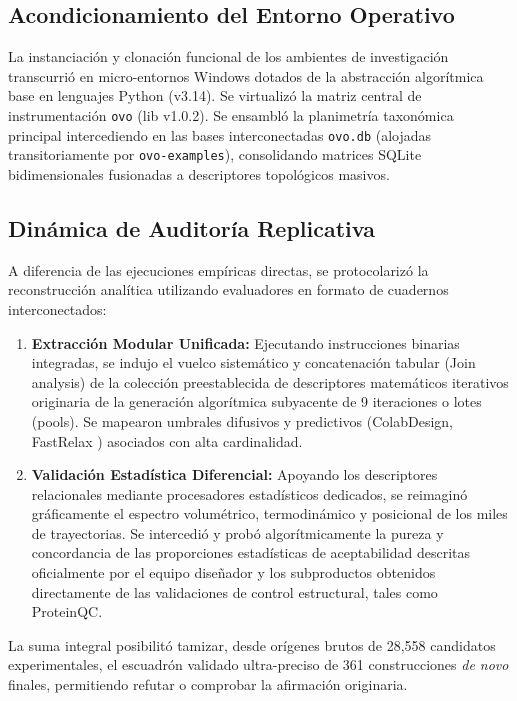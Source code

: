 \documentclass[10pt,a4paper,twocolumn]{article}
\begin{document}
\subsection{Acondicionamiento del Entorno Operativo}

La instanciación y clonación funcional de los ambientes de investigación transcurrió en micro-entornos Windows dotados de la abstracción algorítmica base en lenguajes Python (v3.14). Se virtualizó la matriz central de instrumentación \texttt{ovo} (lib v1.0.2). Se ensambló la planimetría taxonómica principal intercediendo en las bases interconectadas \texttt{ovo.db} (alojadas transitoriamente por \texttt{ovo-examples}), consolidando matrices SQLite bidimensionales fusionadas a descriptores topológicos masivos. 

\subsection{Dinámica de Auditoría Replicativa}

A diferencia de las ejecuciones empíricas directas, se protocolarizó la reconstrucción analítica utilizando evaluadores en formato de cuadernos interconectados:

\begin{enumerate}
    \item \textbf{Extracción Modular Unificada:} Ejecutando instrucciones binarias integradas, se indujo el vuelco sistemático y concatenación tabular (Join analysis) de la colección preestablecida de descriptores matemáticos iterativos originaria de la generación algorítmica subyacente de 9 iteraciones o lotes (pools). Se mapearon umbrales difusivos y predictivos (ColabDesign, FastRelax \cite{bennett2023}) asociados con alta cardinalidad.  
    \item \textbf{Validación Estadística Diferencial:} Apoyando los descriptores relacionales mediante procesadores estadísticos dedicados, se reimaginó gráficamente el espectro volumétrico, termodinámico y posicional de los miles de trayectorias. Se intercedió y probó algorítmicamente la pureza y concordancia de las proporciones estadísticas de aceptabilidad descritas oficialmente por el equipo diseñador y los subproductos obtenidos directamente de las validaciones de control estructural, tales como ProteinQC. 
\end{enumerate}

La suma integral posibilitó tamizar, desde orígenes brutos de 28,558 candidatos experimentales, el escuadrón validado ultra-preciso de 361 construcciones \textit{de novo} finales, permitiendo refutar o comprobar la afirmación originaria.
\end{document}
